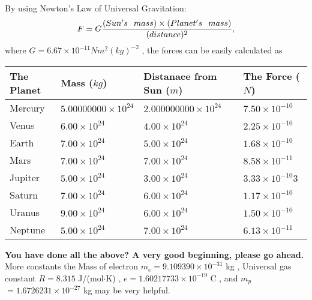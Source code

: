 \documentclass[12pt]{article}
\begin{document}
 
 
 
 
 
\noindent{}

By using Newton's Law of Universal Gravitation:
\[
F=G \frac{(Sun's \hspace{0.1in} mass) \times (Planet's \hspace{0.1in} mass)} { (distance)^2},
\]
where
$ G= %
6.67 \times 10^{-11} N m^{2}(kg)^{-2}$ , the forces can be easily calculated as
 
\vspace{0.2in}
 
 
\begin{tabular}{|l|l|l|l|}
\hline
The Planet & Mass ($kg$) & Distanace from Sun ($m$) & The Force ($N$)\\
\hline
Mercury  &
           $ %
5.00000000 \times 10^{24}  $   &
             $ %
2.000000000 \times 10^{24}$    & $ %
7.50 \times 10^{-10} $
\\  \hline
Venus    &
           $  %
6.00 \times 10^{24}  $     &
             $ %
4.00 \times 10^{24} $    & $ %
2.25 \times 10^{-10} $
\\  \hline
Earth    &
           $  %
7.00 \times 10^{24}$     &
             $ %
5.00 \times 10^{24} $    & $ %
1.68 \times 10^{-10} $
\\   \hline
Mars     &
           $  %
7.00 \times 10^{24} $     &
             $ %
7.00 \times 10^{24}$    & $ %
8.58 \times 10^{-11} $
\\   \hline
Jupiter  &
           $  %
5.00 \times 10^{24}  $    &
             $ %
3.00 \times 10^{24} $    & $ %
3.33 \times 10^{-10}3 $
\\  \hline
Saturn   &
           $  %
7.00 \times 10^{24}   $    &
             $ %
6.00 \times 10^{24}  $    & $ %
1.17 \times 10^{-10} $
\\  \hline
Uranus   &
           $  %
9.00 \times 10^{24} $    &
             $ %
6.00 \times 10^{24}$    & $ %
1.50 \times 10^{-10} $
\\  \hline
Neptune  &
           $  %
5.00 \times 10^{24}  $    &
             $ %
7.00 \times 10^{24} $    & $ %
6.13 \times 10^{-11} $
\\  \hline
 
\end{tabular}
 
 
 
 
   
   
\vspace{0.3in}
{\textbf{\LARGE{You have done all the above? A very good beginning, please go ahead.}}}
More constants the
Mass of electron
$m_e$$ =
9.109390 \times 10^{-31} $
kg
,
Universal gas constant
$R$$ =
8.315 $
J/(mol$\cdot $K)
,
$e$$ =
1.60217733 \times 10^{-19} $
C
, and
$m_p$$ =
1.6726231 \times 10^{-27} $
kg
%
may be very helpful.
\vspace{0.3in}
   
\end{document}
